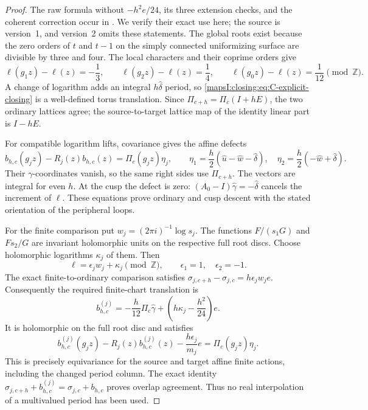 \begin{proof}
The raw formula without \(-h^2e/24\), its three extension checks,
and the coherent correction occur in
\cite[Proposition~7.8 and Appendix~C, Proposition~C.2]{DuEtAl2026v1}. We verify their exact use
here; the source is version~1, and version~2 omits these statements.
The global roots exist because the zero orders of \(t\) and \(t-1\)
on the simply connected uniformizing surface are divisible by three
and four. The local characters and their coprime orders give
\[
 \ell(g_1z)-\ell(z)=-\frac13,\qquad
 \ell(g_2z)-\ell(z)=\frac14,\qquad
 \ell(g_0z)-\ell(z)=\frac1{12}\pmod{\mathbb Z}.
\]
A change of logarithm adds an integral \(h\widehat\delta\) period,
so \eqref{mapsI:closing:eq:C-explicit-closing} is a well-defined torus translation.
Since \(\Pi_{c+h}=\Pi_c(I+hE)\), the two ordinary lattices agree;
the source-to-target lattice map of the identity linear part is
\(I-hE\).

For compatible logarithm lifts, covariance gives the affine defects
\[
 b_{h,c}(g_jz)-R_j(z)b_{h,c}(z)
       =\Pi_c(g_jz)\eta_j,\qquad
 \eta_1=\frac h2(\widehat u-\widehat w-\widehat\delta),\quad
 \eta_2=\frac h2(-\widehat w+\widehat\delta).
\]
Their \(\gamma\)-coordinates vanish, so the same right sides use
\(\Pi_{c+h}\). The vectors are integral for even \(h\). At the
cusp the defect is zero: \((A_0-I)\widehat\gamma=-\widehat\delta\)
cancels the increment of \(\ell\). These equations prove ordinary
and cusp descent with the stated orientation of the peripheral
loops.

For the finite comparison put \(w_j=(2\pi i)^{-1}\log s_j\).
The functions \(F/(s_1G)\) and \(Fs_2/G\) are invariant
holomorphic units on the respective full root discs. Choose
holomorphic logarithms \(\kappa_j\) of them. Then
\[
 \ell=\epsilon_jw_j+\kappa_j\pmod{\mathbb Z},\qquad
 \epsilon_1=1,\quad\epsilon_2=-1.
\]
The exact finite-to-ordinary comparison satisfies
\(\sigma_{j,c+h}-\sigma_{j,c}=h\epsilon_jw_je\).
Consequently the required finite-chart translation is
\[
 b^{(j)}_{h,c}
 =-\frac h{12}\Pi_c\widehat\gamma
       +\left(h\kappa_j-\frac{h^2}{24}\right)e.
\]
It is holomorphic on the full root disc and satisfies
\[
 b^{(j)}_{h,c}(g_jz)-R_j(z)b^{(j)}_{h,c}(z)
       -\frac{h\epsilon_j}{m_j}e
 =\Pi_c(g_jz)\eta_j.
\]
This is precisely equivariance for the source and target affine
finite actions, including the changed period column. The exact
identity
\(\sigma_{j,c+h}+b^{(j)}_{h,c}
=\sigma_{j,c}+b_{h,c}\) proves overlap agreement. Thus no real
interpolation of a multivalued period has been used.


\end{proof}
